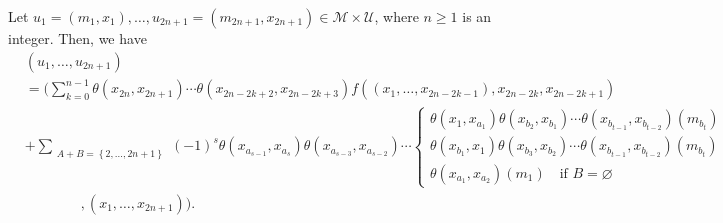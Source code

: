 \documentclass[11pt, twoside]{article}
\begin{document}
\begin{prop}
    Let $u_1=(m_1,x_1),\ldots,u_{2n+1}=(m_{2n+1},x_{2n+1})\in \mathcal{M}\times \mathcal{U} $, where $n\geq 1$ is an integer. Then, we have {\small\begin{align*}
       & (u_1,\ldots,u_{2n+1})\\ &= \bigg( \sum\limits_{k=0}^{n-1}\theta(x_{2n},x_{2n+1})\cdots\theta(x_{2n-2k+2},x_{2n-2k+3}) f((x_1,\ldots,x_{2n-2k-1}),x_{2n-2k},x_{2n-2k+1})\\ &+\sum_{\substack{A+B=\left\{2,\ldots,2n+1\right\}}}(-1)^s\theta(x_{a_{s-1}},x_{a_s})\theta(x_{a_{s-3}},x_{a_{s-2}})\cdots \left\{\begin{matrix}
\theta (x_1,x_{a_1})\theta(x_{b_2},x_{b_1})\cdots\theta(x_{b_{t-1}},x_{b_{t-2}})(m_{b_t}) \\\theta (x_{b_1},x_1)\theta(x_{b_3},x_{b_2})\cdots\theta(x_{b_{t-1}},x_{b_{t-2}})(m_{b_t})\\ \theta(x_{a_1},x_{a_2})(m_1) \,\,\,\,\,\,\text{if $B=\varnothing$}
\end{matrix}\right. \\ & \,\,\,\,\,\,\,\,\,\,\,\,\,\,\,\,\,\,\,\,\,\,\,\, , (x_1,\ldots,x_{2n+1})\bigg).
    \end{align*} }
\end{prop}
\end{document}
